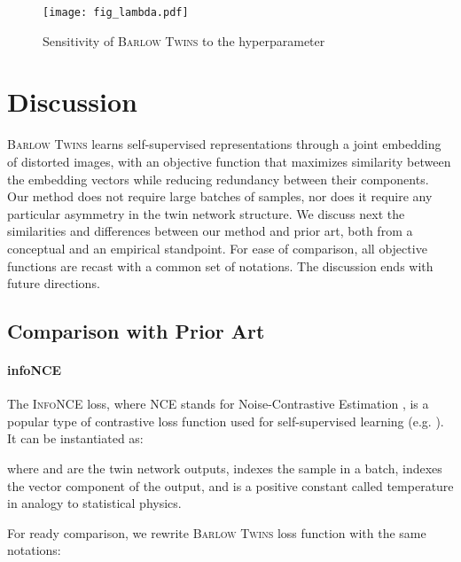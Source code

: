 \documentclass{article}
\newcommand{\AlgoName}{\textsc{Barlow Twins}}
\begin{document}
\begin{figure}[h!]
\vskip 0.2in
\begin{center}
\centerline{\texttt{[image: fig\_lambda.pdf]}}
\caption{Sensitivity of \AlgoName{} to the hyperparameter }
\label{fig:fig_lambda}
\end{center}
\vskip -0.2in
\end{figure}











 \section{Discussion}

\AlgoName{} learns self-supervised representations through a joint embedding of distorted images, with an objective function that maximizes similarity between the embedding vectors while reducing redundancy between their components. Our method does not require large batches of samples, nor does it require any particular asymmetry in the twin network structure. We discuss next the similarities and differences between our method and prior art, both from a conceptual and an empirical standpoint. For ease of comparison, all objective functions are recast with a common set of notations. The discussion ends with future directions.

\subsection{Comparison with Prior Art}

\paragraph{infoNCE}

The \textsc{InfoNCE} loss, where NCE stands for Noise-Contrastive Estimation \cite{gutmann_noise-contrastive_2010}, is a popular type of contrastive loss function used for self-supervised learning (e.g. \cite{oord2018representation, chen2020simple, he2019momentum,henaff2019data}). It can be instantiated as:


where  and  are the twin network outputs,  indexes the sample in a batch,  indexes the vector component of the output, and  is a positive constant called temperature in analogy to statistical physics.

For ready comparison, we rewrite \AlgoName{} loss function with the same notations:
\end{document}
